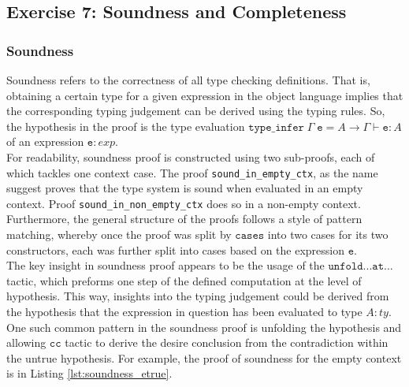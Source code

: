 \documentclass{article}
\newcommand{\tt}[1]{\texttt{#1}}
\begin{document}
\subsection{Exercise 7: Soundness and Completeness}

\subsubsection{Soundness}
Soundness refers to the correctness of all type checking definitions. That is, obtaining a certain type for a given expression in the object language implies that the corresponding typing judgement can be derived using the typing rules. So, the hypothesis in the proof is the type evaluation ${\tt{type\_infer}} \; \Gamma \; {\tt{e}} = A \to \Gamma \vdash {\tt{e}} : A$ of an expression ${\tt{e}} : exp$. \\

For readability, soundness proof is constructed using two sub-proofs, each of which tackles one context case. The proof {\tt{sound\_in\_empty\_ctx}}, as the name suggest proves that the type system is sound when evaluated in an empty context. Proof {\tt{sound\_in\_non\_empty\_ctx}} does so in a non-empty context. Furthermore, the general structure of the proofs follows a style of pattern matching, whereby once the proof was split by ${\tt{cases}}$ into two cases for its two constructors, each was further split into cases based on the expression ${\tt{e}}$. \\

The key insight in soundness proof appears to be the usage of the ${\tt{unfold}} ... {\tt{at}} ...$ tactic, which preforms one step of the defined computation at the level of hypothesis. This way, insights into the typing judgement could be derived from the hypothesis that the expression in question has been evaluated to type $A : ty$. \\

One such common pattern in the soundness proof is unfolding the hypothesis and allowing ${\tt{cc}}$ tactic to derive the desire conclusion from the contradiction within the untrue hypothesis. For example, the proof of soundness for the empty context is in Listing \ref{lst:soundness_etrue}. \\
\end{document}
